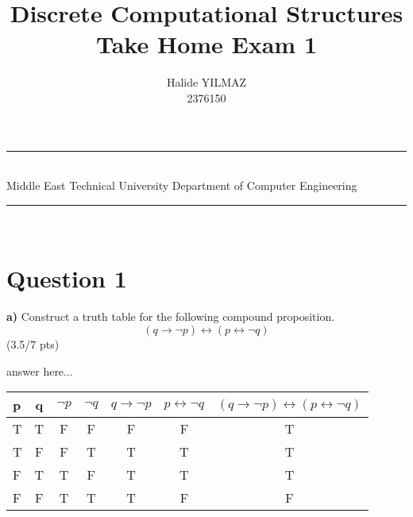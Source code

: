 \documentclass[a4paper,12pt]{article}
\title{Discrete Computational Structures \\ Take Home Exam 1}
\author{Halide YILMAZ \\ 2376150} %
\date{} %
\newcommand{\HRule}{\rule{\linewidth}{1mm}}
\newcommand\tab[1][1cm]{\hspace*{#1}}
\begin{document}
\HRule\\
Middle East Technical University \hfill Department of Computer Engineering
{\let\newpage\relax\maketitle}
\HRule\\
\vspace{1cm}


\section*{Question 1 \hfill {}}

\tab \textbf{a)} Construct a truth table for the following compound proposition.
\begin{equation*}
    (q \rightarrow \neg p)\leftrightarrow (p \leftrightarrow \neg q)
\end{equation*} 
\hfill \small{(3.5/7 pts)} \\
\begin{tcolorbox}
answer here...\\
\begin{tabular}{|l|c|c|c|c|c|c|}
    \hline
     p & q & $ \neg p $ & $\neg q $ & $ q\rightarrow \neg p $ & $ p \leftrightarrow \neg q $ & $ (q\rightarrow \neg p)   \leftrightarrow (p \leftrightarrow \neg q ) $ \\
    \hline \hline
    T&T&F&F&F&F&T \\
    \hline
    T&F&F&T&T&T&T \\
    \hline
    F&T&T&F&T&T&T\\
    \hline
    F&F&T&T&T&F&F\\ \hline
\end{tabular}
\vspace{1cm} %
\end{tcolorbox}
\end{document}
